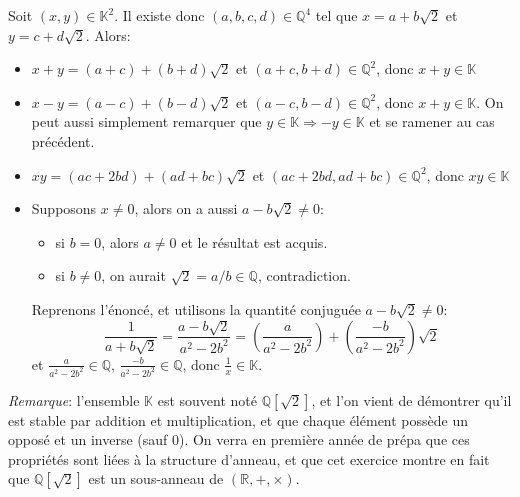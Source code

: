 Soit $(x,y)\in\mathbb{K}^2$. Il existe donc $(a,b,c,d)\in\mathbb{Q}^4$ tel que $x=a+b\sqrt{2}$ et $y=c+d\sqrt{2}$. Alors:
\begin{itemize}
  \item $x+y=(a+c)+(b+d)\sqrt{2}$ et $(a+c, b+d)\in\mathbb{Q}^2$, donc $x+y\in\mathbb{K}$
  \item $x-y=(a-c)+(b-d)\sqrt{2}$ et $(a-c, b-d)\in\mathbb{Q}^2$, donc $x+y\in\mathbb{K}$. On peut aussi simplement remarquer que $y\in\mathbb{K}\Rightarrow -y\in\mathbb{K}$ et se ramener au cas précédent.
  \item $xy=(ac+2bd)+(ad+bc)\sqrt{2}$ et $(ac+2bd, ad+bc)\in\mathbb{Q}^2$, donc $xy\in\mathbb{K}$
  \item    Supposons $x\neq 0$, alors on a aussi $a-b\sqrt{2}\neq 0$: 
    \begin{itemize}
      \item si $b=0$, alors $a\neq 0$ et le résultat est acquis.
      \item si $b\neq 0$, on aurait $\sqrt{2}=a/b\in\mathbb{Q}$, contradiction.
    \end{itemize}
  Reprenons l’énoncé, et utilisons la quantité conjuguée $a-b\sqrt{2}\neq 0$:
  \[
  \frac{1}{a+b\sqrt{2}}=\frac{a-b\sqrt{2}}{a^2-2b^2} = \left(\frac{a}{a^2-2b^2} \right) + \left(\frac{-b}{a^2-2b^2} \right)\sqrt{2}
  \]
  et $\frac{a}{a^2-2b^2}\in\mathbb{Q}$, $\frac{-b}{a^2-2b^2} \in\mathbb{Q}$, donc $\frac{1}{x}\in \mathbb{K}$. \\
\end{itemize}
\textit{Remarque}: l'ensemble $\mathbb{K}$ est souvent noté $\mathbb{Q}[\sqrt{2}]$, et l'on vient de démontrer qu'il est stable par addition et multiplication, et que chaque élément possède un opposé et un inverse (sauf 0). On verra en première année de prépa que ces propriétés sont liées à la structure d'anneau, et que cet exercice montre en fait que $\mathbb{Q}[\sqrt{2}]$ est un sous-anneau de $(\mathbb{R}, +, \times)$.
